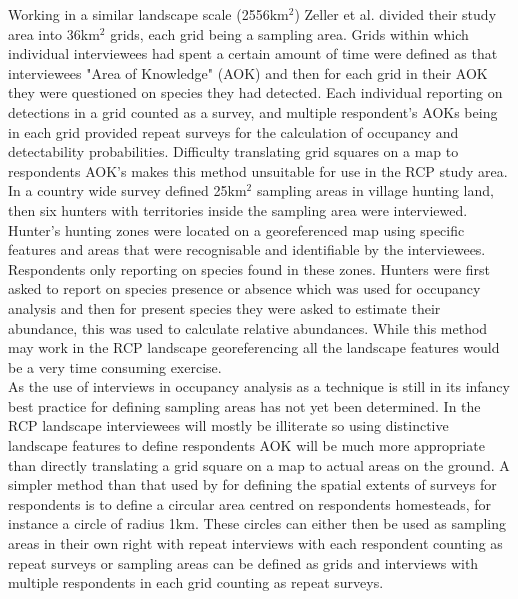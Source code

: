 Working in a similar landscape scale (2556km$^2$) Zeller et al. \cite{Zeller2011} divided their study area into 36km$^2$ grids, each grid being a sampling area. Grids within which individual interviewees had spent a certain amount of time were defined as that interviewees "Area of Knowledge" (AOK) and then for each grid in their AOK they were questioned on species they had detected. Each individual reporting on detections in a grid counted as a survey, and multiple respondent's AOKs being in each grid provided repeat surveys for the calculation of occupancy and detectability probabilities. Difficulty translating grid squares on a map to respondents AOK's makes this method unsuitable for use in the RCP study area.\\

In a country wide survey \citet{Martinez2011} defined 25km$^2$ sampling areas in village hunting land, then six hunters with territories inside the sampling area were interviewed. Hunter's hunting zones were located on a georeferenced map using specific features and areas that were recognisable and identifiable by the interviewees. Respondents only reporting on species found in these zones. Hunters were first asked to report on species presence or absence which was used for occupancy analysis and then for present species they were asked to estimate their abundance, this was used to calculate relative abundances. While this method may work in the RCP landscape georeferencing all the landscape features would be a very time consuming exercise.\\

As the use of interviews in occupancy analysis as a technique is still in its infancy best practice for defining sampling areas has not yet been determined. In the RCP landscape interviewees will mostly be illiterate so using distinctive landscape features to define respondents AOK will be much more appropriate than directly translating a grid square on a map to actual areas on the ground. A simpler method than that used by \citet{Martinez2011} for defining the spatial extents of surveys for respondents is to define a circular area centred on respondents homesteads, for instance a circle of radius 1km. These circles can either then be used as sampling areas in their own right with repeat interviews with each respondent counting as repeat surveys or sampling areas can be defined as grids and interviews with multiple respondents in each grid counting as repeat surveys.\\

